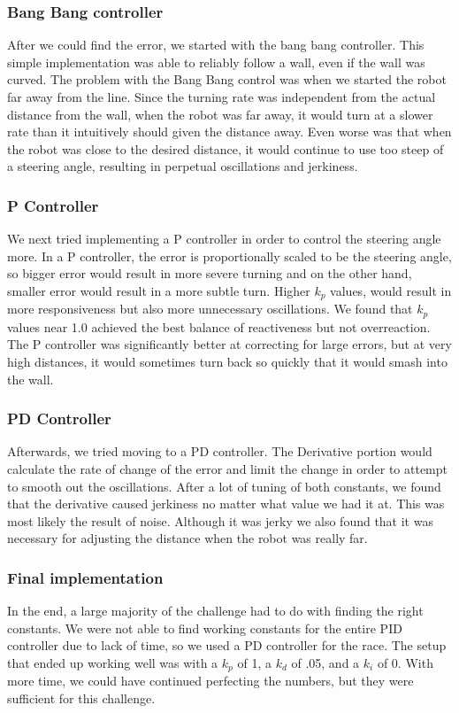 \documentclass[journal, a4paper]{IEEEtran}
\begin{document}
\subsubsection{Bang Bang controller} After we could find the error, we started with the bang bang controller. This simple implementation was able to reliably follow a wall, even if the wall was curved. The problem with the Bang Bang control was when we started the robot far away from the line. Since the turning rate was independent from the actual distance from the wall, when the robot was far away, it would turn at a slower rate than it intuitively should given the distance away. Even worse was that when the robot was close to the desired distance, it would continue to use too steep of a steering angle, resulting in perpetual oscillations and jerkiness. 
\subsubsection{P Controller}We next tried implementing a P controller in order to control the steering angle more. In a P controller, the error is proportionally scaled to be the steering angle, so bigger error would result in more severe turning and on the other hand, smaller error would result in a more subtle turn. Higher $k_p$ values, would result in more responsiveness but also more unnecessary oscillations. We found that $k_p$ values near 1.0 achieved the best balance of reactiveness but not overreaction. The P controller was significantly better at correcting for large errors, but at very high distances, it would sometimes turn back so quickly that it would smash into the wall. 
\subsubsection{PD Controller}Afterwards, we tried moving to a PD controller. The Derivative portion would calculate the rate of change of the error and limit the change in order to attempt to smooth out the oscillations. After a lot of tuning of both  constants, we found that the derivative caused jerkiness no matter what value we had it at. This was most likely the result of noise. Although it was jerky we also found that it was  necessary for adjusting the distance when the robot was really far. 
\subsubsection{Final implementation}In the end, a large majority of the challenge had to do with finding the right constants. We were not able to find working constants for the entire PID controller due to lack of time, so we used a PD controller for the race. The setup that ended up working well was with a $k_p$ of 1, a $k_d$ of .05, and a $k_i$ of 0. 
With more time, we could have continued perfecting the numbers, but they were sufficient for this challenge. 
\end{document}
